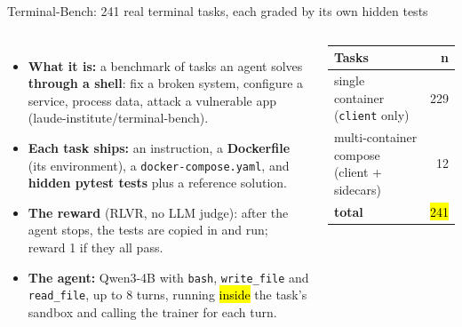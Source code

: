 \begin{frame}{Terminal-Bench: 241 real terminal tasks, each graded by its own hidden tests}
\begin{columns}[T]
\begin{itemize}\footnotesize\setlength{\itemsep}{1.2mm}
\item \textbf{What it is:} a benchmark of tasks an agent solves \textbf{through a shell}: fix a broken
  system, configure a service, process data, attack a vulnerable app (laude-institute/terminal-bench).
\item \textbf{Each task ships:} an instruction, a \textbf{Dockerfile} (its environment), a
  \texttt{docker-compose.yaml}, and \textbf{hidden pytest tests} plus a reference solution.
\item \textbf{The reward} (RLVR, no LLM judge): after the agent stops, the tests are copied in and run;
  reward 1 if they all pass.
\item \textbf{The agent:} Qwen3-4B with \texttt{bash}, \texttt{write\_file} and \texttt{read\_file}, up to 8
  turns, running \hl{inside} the task's sandbox and calling the trainer for each turn.
\end{itemize}
\footnotesize\setlength{\tabcolsep}{4pt}
\begin{tabular}{@{}l r@{}}
\toprule
\textbf{Tasks} & \textbf{n}\\
\midrule
single container (\texttt{client} only) & 229\\
multi-container compose (client + sidecars) & 12\\
\midrule
\textbf{total} & \hl{241}\\
\bottomrule
\end{tabular}
\vspace{2mm}
\end{columns}
\end{frame}

